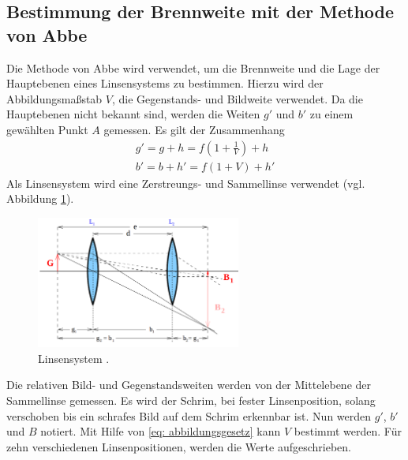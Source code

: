\subsection{Bestimmung der Brennweite mit der Methode von Abbe}
Die Methode von Abbe wird verwendet, um die Brennweite und die Lage der Hauptebenen
eines Linsensystems zu bestimmen. Hierzu wird der Abbildungsmaßstab $V$,
die Gegenstands- und Bildweite verwendet. Da die Hauptebenen nicht bekannt sind,
werden die Weiten $g'$ und $b'$ zu einem gewählten Punkt $A$ gemessen. Es gilt der Zusammenhang
\begin{align}
    g'=g+h=f\left(1+\frac{1}{V}\right)+h \label{eq: abstaende_abbe_g} \\
    b'=b+h'=f\left(1+V\right)+h' \label{eq: abstaende_abbe_b}
\end{align}
Als Linsensystem wird eine Zerstreungs- und Sammellinse verwendet (vgl. Abbildung \ref{fig: linsensystem}).
\begin{figure}
    \centering
    \includegraphics[width=0.6\textwidth]{./pics/linsensystem.png}
    \caption{Linsensystem \cite{anleitung408}.}
    \label{fig: linsensystem}
\end{figure}
Die relativen Bild- und Gegenstandsweiten werden von der Mittelebene
der Sammellinse gemessen.
Es wird der Schrim, bei fester Linsenposition, solang verschoben bis ein schrafes
Bild auf dem Schrim erkennbar ist. Nun werden $g'$, $b'$ und $B$ notiert.
Mit Hilfe von \eqref{eq: abbildungsgesetz} kann $V$ bestimmt werden.
Für zehn verschiedenen Linsenpositionen, werden die Werte aufgeschrieben.
